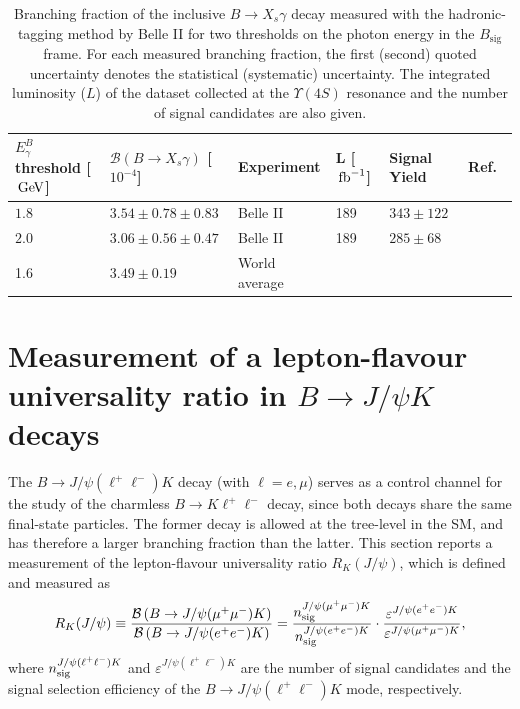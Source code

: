 \documentclass{moriond}
\def\ufours{\ensuremath{\Upsilon(4S)}\xspace}
\def\gev{\ensuremath{\mathrm{\,Ge\kern -0.1em V}}\xspace}
\def\invfb{\ensuremath{\mbox{\,fb}^{-1}}\xspace}
\newcommand\Tstrut{\rule{0pt}{2.6ex}}         %
\newcommand\Bstrut{\rule[-0.9ex]{0pt}{0pt}}   %
\begin{document}
\begin{table}[tb]
\caption{Branching fraction of the inclusive $B\rightarrow X_s \gamma$ decay measured with the hadronic-tagging method by Belle II for two thresholds on the photon energy in the $B_{\mathrm{sig}}$ frame.
For each measured branching fraction, the first (second) quoted uncertainty denotes the statistical (systematic) uncertainty.
The integrated luminosity ($L$) of the dataset collected at the \ufours resonance and the number of signal candidates are also given.
}
\vspace{0.4cm}
\centering
\begin{tabular}{|lllllc|}
\hline
$E_\gamma^B$ threshold [$\gev$] & $\mathcal{B}(B\rightarrow X_s \gamma)$ [$10^{-4}$] & Experiment & L [$\invfb$] & Signal Yield & Ref.~\Tstrut\Bstrut\\
\hline
$1.8$ & $3.54 \pm 0.78 \pm 0.83$ & Belle II & 189 & $343\pm122$ & \cite{Belle-II:2022hys} \Tstrut\\
$2.0$ & $3.06 \pm 0.56 \pm 0.47$ & Belle II & 189 & $285\pm68$ & \cite{Belle-II:2022hys} \Bstrut\\
\hline
1.6 & $3.49\pm0.19$ & World average &  &  & \cite{ParticleDataGroup:2022pth} \Tstrut\Bstrut\\
\hline
\end{tabular}
\label{tab:xsgamma}
\end{table}
\section{Measurement of a lepton-flavour universality ratio in $B \to J/\psi K$ decays}\label{sec:jpsik}

The $B \to J/\psi (\ell^+\ell^-) K$ decay (with $\ell=e,\mu$) serves as a control channel for the study of the charmless $B \to K\ell^+\ell^-$ decay, since both decays share the same final-state particles.
The former decay is allowed at the tree-level in the SM, and has therefore a larger branching fraction than the latter.
This section reports a measurement of the lepton-flavour universality ratio $R_{K}{\left(J/\psi\right)}$, which is defined and measured as 
\begin{equation}\label{eq:luratio}
    R_{K}{\left(J/\psi\right)} \equiv 
    \frac{\mathcal{B}\left(B\to J/\psi(\mu^{+}\mu^{-})K\right)}{\mathcal{B}\left(B\to J/\psi(e^{+}e^{-})K\right)}=
    \frac{n_{\rm sig}^{J/\psi(\mu^{+}\mu^{-})K}}{n_{\rm sig}^{J/\psi(e^{+}e^{-})K}} \cdot
    \frac{\varepsilon^{J/\psi(e^{+}e^{-})K}}{\varepsilon^{J/\psi(\mu^{+}\mu^{-})K}},
\end{equation}
where $n_{\rm sig}^{J/\psi(\ell^{+}\ell^{-})K}$ and $\varepsilon^{J/\psi(\ell^{+}\ell^{-})K}$ are the number of signal candidates and the signal selection efficiency of the $B\to J/\psi(\ell^{+}\ell^{-})K$ mode, respectively.
\end{document}
